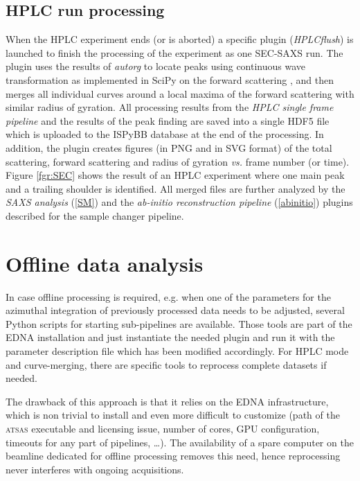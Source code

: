 \documentclass[preprint,pdf]{iucr}              %
\begin{document}
\subsection{HPLC run processing}
When the HPLC experiment ends (or is aborted) a specific plugin (\textit{HPLCflush}) is launched to
finish the processing of the experiment as one SEC-SAXS run.
The plugin uses the results of \textit{autorg} to locate peaks using continuous
wave transformation as implemented in SciPy on the forward scattering
\cite{cwt,scipy}, and then merges all individual curves around a local maxima
of the forward scattering with similar radius of gyration.
All processing results from the \textit{HPLC single frame pipeline} and the results of
the peak finding are saved into a single HDF5 file which is uploaded to the
ISPyBB database at the end of the processing.
In addition, the plugin creates figures (in PNG and in SVG format) of the
total scattering, forward scattering and radius of gyration \textit{vs.} frame
number (or time).
Figure \ref{fgr:SEC} shows the result of an HPLC
experiment where one main peak and a trailing shoulder is identified.
All merged files are further analyzed by the \textit{SAXS analysis}
(\ref{SM}) and the \textit{ab-initio reconstruction pipeline}
(\ref{abinitio}) plugins described for the sample changer pipeline.

\section{Offline data analysis}
In case offline processing is required, e.g. when one of the parameters for
the azimuthal integration of previously processed data needs to be adjusted,
several Python scripts for starting sub-pipelines are available.
Those tools are part of the EDNA installation and just instantiate the needed
plugin and run it with the parameter description file which has been modified
accordingly.
For HPLC mode and curve-merging, there are specific tools to reprocess complete
datasets if needed.

The drawback of this approach is that it relies on the EDNA infrastructure, which is
non trivial to install and even more difficult to customize (path of the
\textsc{atsas} executable and licensing issue, number of cores, GPU
configuration, timeouts for any part of pipelines, \ldots).
The availability of a spare computer on the beamline dedicated for offline
processing removes this need, hence reprocessing never interferes with ongoing
acquisitions.
\end{document}
